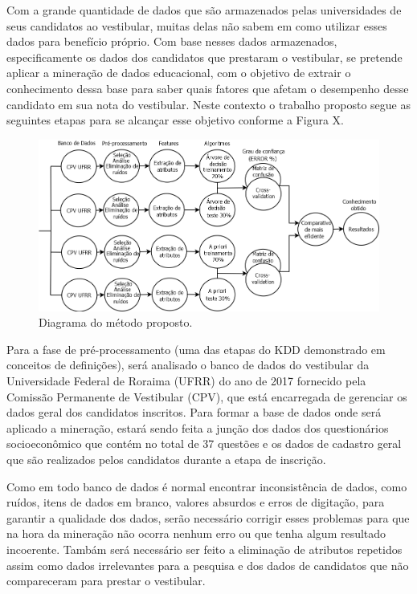 \label{chapter:metodo}

\par
Com a grande quantidade de dados que são armazenados pelas universidades de seus candidatos ao vestibular, muitas delas não sabem em como utilizar esses dados para benefício próprio. Com base nesses dados armazenados, especificamente os dados dos candidatos que prestaram o vestibular, se pretende aplicar a mineração de dados educacional, com o objetivo de extrair o conhecimento dessa base para saber quais fatores que afetam o desempenho desse candidato em sua nota do vestibular. Neste contexto o trabalho proposto segue as seguintes etapas para se alcançar esse objetivo conforme a Figura X.

\par
\begin{figure}[!htp]
	\begin{center}
    \caption{\label{fig:waveform_fig} Diagrama do método proposto.}
	\includegraphics[scale=0.45]{Figuras/Caso_de_uso_metodo_TCC1.png}
	\end{center}
\end{figure}

\par
Para a fase de pré-processamento (uma das etapas do KDD demonstrado em conceitos de definições), será analisado o banco de dados do vestibular da Universidade Federal de Roraima (UFRR) do ano de 2017 fornecido pela Comissão Permanente de Vestibular (CPV), que está encarregada de gerenciar os dados geral dos candidatos inscritos. Para formar a base de dados onde será aplicado a mineração, estará sendo feita a junção dos dados dos questionários socioeconômico que contém no total de 37 questões e os dados de cadastro geral que são realizados pelos candidatos durante a etapa de inscrição.


\par
Como em todo banco de dados é normal encontrar inconsistência de dados, como ruídos, itens de dados em branco, valores absurdos e erros de digitação, para garantir a qualidade dos dados, serão necessário corrigir esses problemas para que na hora da mineração não ocorra nenhum erro ou que tenha algum resultado incoerente. Tambám será necessário ser feito a eliminação de atributos repetidos assim como dados irrelevantes para a pesquisa e dos dados de candidatos que não compareceram para prestar o vestibular.

